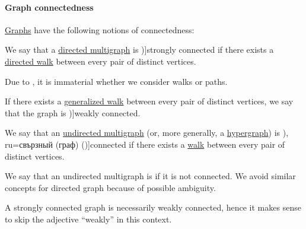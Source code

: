 \paragraph{Graph connectedness}

\begin{definition}\label{def:graph_connectedness}
  \hyperref[rem:arbitrary_kind_graph]{Graphs} have the following notions of connectedness:
  \begin{thmenum}
     We say that a \hyperref[def:directed_multigraph]{directed multigraph} is \term[ru=сильно связаный (граф) (\cite[def. 5.2]{БелоусовТкачёв2004ДискретнаяМатематика})]{strongly connected} if there exists a \hyperref[def:graph_walk/directed]{directed walk} between every pair of distinct vertices.

    Due to , it is immaterial whether we consider walks or paths.

     If there exists a \hyperref[def:graph_walk/generalized]{generalized walk} between every pair of distinct vertices, we say that the graph is \term[ru=слабо связный (граф) (\cite[def. 5.4]{БелоусовТкачёв2004ДискретнаяМатематика})]{weakly connected}.

     We say that an \hyperref[def:hypergraph/multigraph]{undirected multigraph} (or, more generally, a \hyperref[def:hypergraph]{hypergraph}) is \term[bg=свързан (граф) (\cite[13]{Мирчев2001Графи}), ru=свързный (граф) (\cite[285]{БелоусовТкачёв2004ДискретнаяМатематика})]{connected} if there exists a \hyperref[def:graph_walk/undirected]{walk} between every pair of distinct vertices.

    We say that an undirected multigraph is  if it is not connected. We avoid similar concepts for directed graph because of possible ambiguity.
  \end{thmenum}
\end{definition}
\begin{comments}
  \item A strongly connected graph is necessarily weakly connected, hence it makes sense to skip the adjective \enquote{weakly} in this context.
\end{comments}

